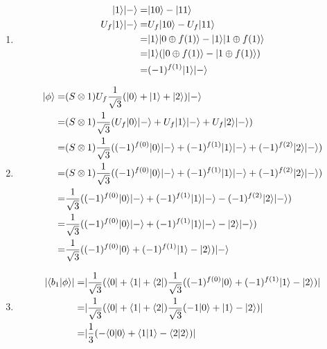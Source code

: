 \documentclass{assignment}
\newcommand{\inner}[2]{\ensuremath{\langle{#1}|{#2}\rangle}}
\begin{document}
\begin{problemlist}
  \pbitem
  \begin{problem}
  \end{problem}
  \begin{answer}
    \\
    \begin{enumerate}
    \item
      \begin{align*}
      \ket{1}\ket{-}=&\ket{10}-\ket{11}\\
      U_f\ket{1}\ket{-}=&U_f\ket{10}-U_f\ket{11}\\
      =&\ket{1}\ket{0\oplus f(1)}-\ket{1}\ket{1\oplus f(1)}\\
      =&\ket{1}(\ket{0\oplus f(1)}-\ket{1\oplus f(1)})\\
      =&(-1)^{f(1)}\ket{1}\ket{-}\\
      \end{align*}
    \item
      \begin{align*}
        \ket{\phi}=&(S\otimes 1)U_f\frac{1}{\sqrt{3}}(\ket{0}+\ket{1}+\ket{2})\ket{-}\\
        =&(S\otimes 1)\frac{1}{\sqrt{3}}(U_f\ket{0}\ket{-}+U_f\ket{1}\ket{-}+U_f\ket{2}\ket{-})\\
        =&(S\otimes 1)\frac{1}{\sqrt{3}}((-1)^{f(0)}\ket{0}\ket{-}+(-1)^{f(1)}\ket{1}\ket{-}+(-1)^{f(2)}\ket{2}\ket{-})\\
        =&(S\otimes 1)\frac{1}{\sqrt{3}}((-1)^{f(0)}\ket{0}\ket{-}+(-1)^{f(1)}\ket{1}\ket{-}+(-1)^{f(2)}\ket{2}\ket{-})\\
        =&\frac{1}{\sqrt{3}}((-1)^{f(0)}\ket{0}\ket{-}+(-1)^{f(1)}\ket{1}\ket{-}-(-1)^{f(2)}\ket{2}\ket{-})\\
        =&\frac{1}{\sqrt{3}}((-1)^{f(0)}\ket{0}\ket{-}+(-1)^{f(1)}\ket{1}\ket{-}-\ket{2}\ket{-})\\
        =&\frac{1}{\sqrt{3}}((-1)^{f(0)}\ket{0}+(-1)^{f(1)}\ket{1}-\ket{2})\ket{-}\\
      \end{align*}
    \item
      \begin{align*}
        |\inner{b_1}{\phi}|=&|\frac{1}{\sqrt{3}}(\bra{0}+\bra{1}+\bra{2})\frac{1}{\sqrt{3}}((-1)^{f(0)}\ket{0}+(-1)^{f(1)}\ket{1}-\ket{2})|\\
        =&|\frac{1}{\sqrt{3}}(\bra{0}+\bra{1}+\bra{2})\frac{1}{\sqrt{3}}(-1\ket{0}+\ket{1}-\ket{2})|\\
        =&|\frac{1}{3}(-\inner{0}{0}+\inner{1}{1}-\inner{2}{2})|\\

\end{align*}
\end{enumerate}
\end{answer}
\end{problemlist}
\end{document}
